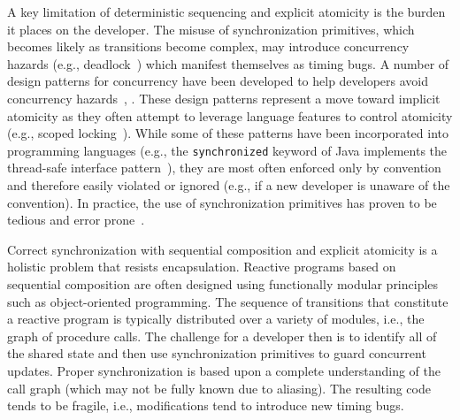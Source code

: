 A key limitation of deterministic sequencing and explicit atomicity is the burden it places on the developer.
The misuse of synchronization primitives, which becomes likely as transitions become complex, may introduce concurrency hazards (e.g., deadlock~\cite{dijkstra1965cooperating}) which manifest themselves as timing bugs.
A number of design patterns for concurrency have been developed to help developers avoid concurrency hazards~\cite{schmidt2000pattern}, \cite{lea2000concurrent}.
These design patterns represent a move toward implicit atomicity as they often attempt to leverage language features to control atomicity (e.g., scoped locking~\cite{schmidt2000pattern}).
While some of these patterns have been incorporated into programming languages (e.g., the \verb+synchronized+ keyword of Java implements the thread-safe interface pattern~\cite{schmidt2000pattern}), they are most often enforced only by convention and therefore easily violated or ignored (e.g., if a new developer is unaware of the convention).
In practice, the use of synchronization primitives has proven to be tedious and error prone~\cite{sutter2005software}.

Correct synchronization with sequential composition and explicit atomicity is a holistic problem that resists encapsulation.
Reactive programs based on sequential composition are often designed using functionally modular principles such as object-oriented programming.
The sequence of transitions that constitute a reactive program is typically distributed over a variety of modules, i.e., the graph of procedure calls.
The challenge for a developer then is to identify all of the shared state and then use synchronization primitives to guard concurrent updates.
Proper synchronization is based upon a complete understanding of the call graph (which may not be fully known due to aliasing).
The resulting code tends to be fragile, i.e., modifications tend to introduce new timing bugs.

